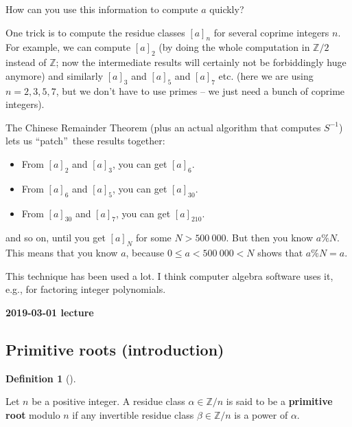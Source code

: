 \documentclass[numbers=enddot,12pt,final,onecolumn,notitlepage]{scrartcl}%
\numberwithin{exer}{subsection}
\theoremstyle{definition}
\newtheorem{defi}[theo]{Definition}
\newenvironment{definition}[1][]
{\begin{defi}[#1]\begin{leftbar}}
{\end{leftbar}\end{defi}}
\begin{document}
How can you use this information to compute $a$ quickly?

One trick is to compute the residue classes $\left[  a\right]  _{n}$ for
several coprime integers $n$. For example, we can compute $\left[  a\right]
_{2}$ (by doing the whole computation in $\mathbb{Z}/2$ instead of
$\mathbb{Z}$; now the intermediate results will certainly not be forbiddingly
huge anymore) and similarly $\left[  a\right]  _{3}$ and $\left[  a\right]
_{5}$ and $\left[  a\right]  _{7}$ etc. (here we are using $n=2,3,5,7$, but we
don't have to use primes -- we just need a bunch of coprime integers).

The Chinese Remainder Theorem (plus an actual algorithm that computes $S^{-1}%
$) lets us \textquotedblleft patch\textquotedblright\ these results together:

\begin{itemize}
\item From $\left[  a\right]  _{2}$ and $\left[  a\right]  _{3}$, you can get
$\left[  a\right]  _{6}$.

\item From $\left[  a\right]  _{6}$ and $\left[  a\right]  _{5}$, you can get
$\left[  a\right]  _{30}$.

\item From $\left[  a\right]  _{30}$ and $\left[  a\right]  _{7}$, you can get
$\left[  a\right]  _{210}$.
\end{itemize}

and so on, until you get $\left[  a\right]  _{N}$ for some $N>500\ 000$. But
then you know $a\%N$. This means that you know $a$, because $0\leq
a<500\ 000<N$ shows that $a\%N=a$.

This technique has been used a lot. I think computer algebra software uses it,
e.g., for factoring integer polynomials.

\begin{center}
\textbf{2019-03-01 lecture}
\end{center}

\subsection{Primitive roots (introduction)}

\begin{definition}
Let $n$ be a positive integer. A residue class $\alpha\in\mathbb{Z}/n$ is said
to be a \textbf{primitive root} modulo $n$ if any invertible residue class
$\beta\in\mathbb{Z}/n$ is a power of $\alpha$.
\end{definition}
\end{document}
